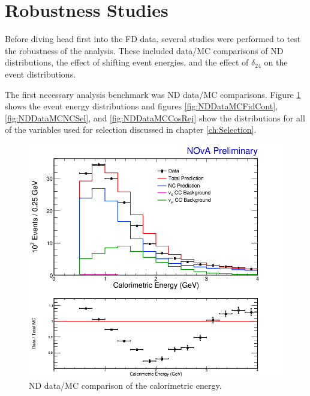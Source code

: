 \section{Robustness Studies}
\label{sec:ResultsND}

Before diving head first into the FD data, several studies were performed to test the robustness of the analysis. These included data/MC comparisons of ND distributions, the effect of shifting event energies, and the effect of $\delta_{24}$ on the event distributions.

The first necessary analysis benchmark was ND data/MC comparisons. Figure \ref{fig:NDDataMCECal} shows the event energy distributions and figures \ref{fig:NDDataMCFidCont}, \ref{fig:NDDataMCNCSel}, and \ref{fig:NDDataMCCosRej} show the distributions for all of the variables used for selection discussed in chapter \ref{ch:Selection}.
\begin{figure}[htbp]
  \centering
  \includegraphics[width=1\textwidth]{figures/NDDataMC/ECalNusNDRat.png}
  \caption[ND Data/MC Comparison: Energy Distribution]{ND data/MC comparison of the calorimetric energy.}
  \label{fig:NDDataMCECal}
\end{figure}


